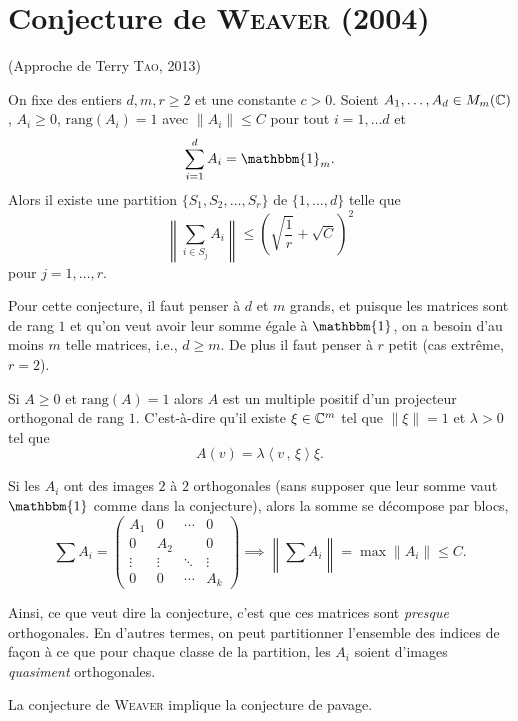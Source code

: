 \section{Conjecture de \textsc{Weaver} (2004)}
\label{sec:conj-de-weaver}
(Approche de Terry \textsc{Tao}, 2013)

\begin{conj}
  On fixe des entiers $d, m, r \geq 2$ et une constante $c > 0$. Soient $A_1, \ldots, A_d \in M_m(\mathbb{C})$, $A_i
  \geq 0$, $\mathrm{rang}(A_i) = 1$ avec $\|A_i\| \leq C$ pour tout $i = 1, \ldots d$ et 
  \[ \sum_{i = 1}^{d}A_i = \mathbbm{1}_m. \]
  Alors il existe une partition $\{S_1, S_2, \ldots, S_r\}$ de $\{1, \ldots, d\}$ telle que 
  \[ \left\| \sum_{i \in S_j}^{} A_i \right\| \leq \left(\sqrt{\frac{1}{r}} + \sqrt{C}\right)^2 \]
  pour $j = 1, \ldots, r$.
\end{conj}

Pour cette conjecture, il faut penser à $d$ et $m$ grands, et puisque les matrices sont de rang $1$ et qu'on
veut avoir leur somme égale à $\mathbbm{1}$, on a besoin d'au moins $m$ telle matrices, i.e., $d \geq m$. De
plus il faut penser à $r$ petit (cas extrême, $r = 2$).

Si $A \geq 0$ et $\mathrm{rang}(A) = 1$ alors $A$ est un multiple positif d'un projecteur orthogonal de rang
$1$. C'est-à-dire qu'il existe $\xi \in \mathbb{C}^m$ tel que $\|\xi\| = 1$ et $\lambda > 0$ tel que 
\[ A(v) = \lambda \left \langle v\, ,\, \xi \right \rangle \xi. \]

Si les $A_i$ ont des images $2$ à $2$ orthogonales (sans supposer que leur somme vaut $\mathbbm{1}$ comme dans
la conjecture), alors la somme se décompose par blocs, 
\[ \sum_{}^{} A_i =
  \begin{pmatrix}
    A_1 & 0 & \cdots & 0\\ 0 & A_2 &  & 0\\ \vdots & \vdots & \ddots & \vdots \\ 0 & 0 & \cdots & A_k
  \end{pmatrix} \implies \left \| \sum_{}^{} A_i \right \| = \max \|A_i\| \leq C.
  \]

Ainsi, ce que veut dire la conjecture, c'est que ces matrices sont \textit{presque} orthogonales. En d'autres
termes, on peut partitionner l'ensemble des indices de façon à ce que pour chaque classe de la partition, les
$A_i$ soient d'images \textit{quasiment} orthogonales.

\begin{prop}
  La conjecture de \textsc{Weaver} implique la conjecture de pavage.
\end{prop}







